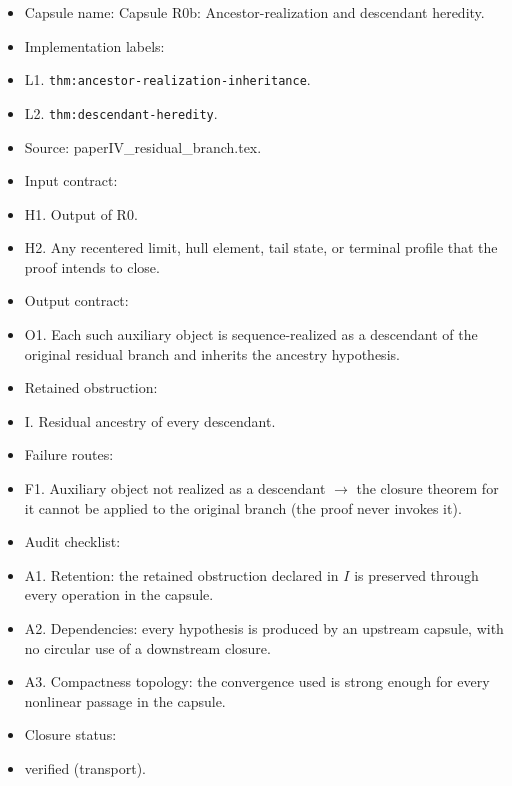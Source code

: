 \documentclass[11pt]{amsart}
\begin{document}
\begin{itemize}
  \item Capsule name: Capsule R0b: Ancestor-realization and descendant heredity.
  \item Implementation labels:
  \item L1. \texttt{thm:ancestor-realization-inheritance}.
  \item L2. \texttt{thm:descendant-heredity}.
  \item Source: paperIV\_residual\_branch.tex.
  \item Input contract:
  \item H1. Output of R0.
  \item H2. Any recentered limit, hull element, tail state, or terminal profile that the proof intends to close.
  \item Output contract:
  \item O1. Each such auxiliary object is sequence-realized as a descendant of the original residual branch and inherits the ancestry hypothesis.
  \item Retained obstruction:
  \item I. Residual ancestry of every descendant.
  \item Failure routes:
  \item F1. Auxiliary object not realized as a descendant $\to$ the closure theorem for it cannot be applied to the original branch (the proof never invokes it).
  \item Audit checklist:
  \item A1. Retention: the retained obstruction declared in $I$ is preserved through every operation in the capsule.
  \item A2. Dependencies: every hypothesis is produced by an upstream capsule, with no circular use of a downstream closure.
  \item A3. Compactness topology: the convergence used is strong enough for every nonlinear passage in the capsule.
  \item Closure status:
  \item verified (transport).
\end{itemize}
\end{document}
